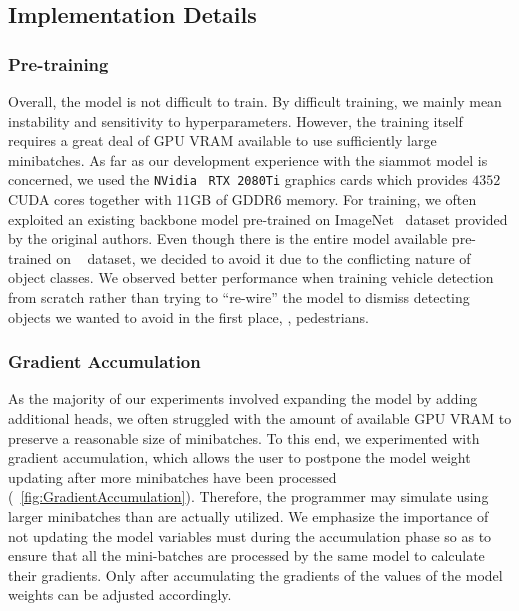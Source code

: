 \subsection{Implementation Details}

\subsubsection{Pre-training}

Overall, the model is not difficult to train. By difficult training, we mainly mean instability and sensitivity to hyperparameters. However, the training itself requires a great deal of GPU VRAM available to use sufficiently large minibatches. As far as our development experience with the \gls{siammot} model is concerned, we used the \texttt{NVidia}~\cite{webnvidia} \texttt{RTX 2080Ti} graphics cards which provides $4352$ CUDA cores together with $11$GB of GDDR6 memory. For training, we often exploited an existing backbone model pre-trained on ImageNet~\cite{deng2009imagenet} dataset provided by the original authors. Even though there is the entire model available pre-trained on \mscoco{}~\cite{lin2014mscoco} dataset, we decided to avoid it due to the conflicting nature of object classes. We observed better performance when training vehicle detection from scratch rather than trying to ``re-wire'' the model to dismiss detecting objects we wanted to avoid in the first place, \egtext{}, pedestrians.

\subsubsection{Gradient Accumulation}

As the majority of our experiments involved expanding the model by adding additional heads, we often struggled with the amount of available GPU VRAM to preserve a reasonable size of minibatches. To this end, we experimented with gradient accumulation, which allows the user to postpone the model weight updating after more minibatches have been processed (\figtext{}~\ref{fig:GradientAccumulation}). Therefore, the programmer may simulate using larger minibatches than are actually utilized. We emphasize the importance of not updating the model variables must during the accumulation phase so as to ensure that all the mini-batches are processed by the same model to calculate their gradients. Only after accumulating the gradients of the values of the model weights can be adjusted accordingly.

